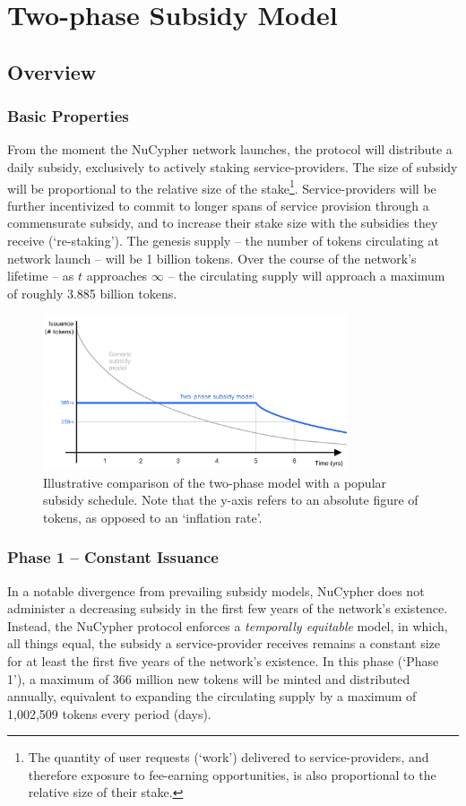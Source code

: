 \documentclass[longbibliography,nofootinbib]{revtex4-1}
\begin{document}
\section{Two-phase Subsidy Model}

\subsection{Overview}

\subsubsection{Basic Properties}
From the moment the NuCypher network launches, the protocol will distribute a daily subsidy, exclusively to actively staking service-providers. The size of subsidy will be proportional to the relative size of the stake\footnote[2]{The quantity of user requests (`work') delivered to service-providers, and therefore exposure to fee-earning opportunities, is also proportional to the relative size of their stake.}. Service-providers will be further incentivized to commit to longer spans of service provision through a commensurate subsidy, and to increase their stake size with the subsidies they receive (`re-staking'). The genesis supply – the number of tokens circulating at network launch – will be 1 billion tokens. Over the course of the network's lifetime – as $t$ approaches $\infty$ – the circulating supply will approach a maximum of roughly 3.885 billion tokens.

\begin{figure}[h!]
    \includegraphics[width=0.8\textwidth]{Two_phase_model.png}
    \caption{Illustrative comparison of the two-phase model with a popular subsidy schedule. Note that the y-axis refers to an absolute figure of tokens, as opposed to an `inflation rate'.}
    \label{fig:tp}
\end{figure}

\subsubsection{Phase 1 – Constant Issuance}
In a notable divergence from prevailing subsidy models, NuCypher does not administer a decreasing subsidy in the first few years of the network's existence. Instead, the NuCypher protocol enforces a \textit{temporally equitable} model, in which, all things equal, the subsidy a service-provider receives remains a constant size for at least the first five years of the network's existence. In this phase (`Phase 1'), a maximum of 366 million new tokens will be minted and distributed annually, equivalent to expanding the circulating supply by a maximum of 1,002,509 tokens every period (days). 
\end{document}
